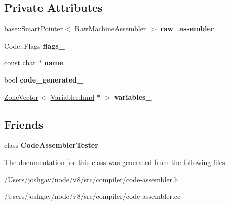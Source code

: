 \subsection*{Private Attributes}
\begin{DoxyCompactItemize}
\item 
\hyperlink{classv8_1_1base_1_1_smart_pointer}{base\+::\+Smart\+Pointer}$<$ \hyperlink{classv8_1_1internal_1_1compiler_1_1_raw_machine_assembler}{Raw\+Machine\+Assembler} $>$ {\bfseries raw\+\_\+assembler\+\_\+}\hypertarget{classv8_1_1internal_1_1compiler_1_1_code_assembler_a4623ee835dcea842de9611fb838ee271}{}\label{classv8_1_1internal_1_1compiler_1_1_code_assembler_a4623ee835dcea842de9611fb838ee271}

\item 
Code\+::\+Flags {\bfseries flags\+\_\+}\hypertarget{classv8_1_1internal_1_1compiler_1_1_code_assembler_a9f59933664fc0a8542f56fc3f664edcc}{}\label{classv8_1_1internal_1_1compiler_1_1_code_assembler_a9f59933664fc0a8542f56fc3f664edcc}

\item 
const char $\ast$ {\bfseries name\+\_\+}\hypertarget{classv8_1_1internal_1_1compiler_1_1_code_assembler_a4257e9c071331474a2b2b68cfefdcca6}{}\label{classv8_1_1internal_1_1compiler_1_1_code_assembler_a4257e9c071331474a2b2b68cfefdcca6}

\item 
bool {\bfseries code\+\_\+generated\+\_\+}\hypertarget{classv8_1_1internal_1_1compiler_1_1_code_assembler_a62b3230328488fe428e23073c48e54b1}{}\label{classv8_1_1internal_1_1compiler_1_1_code_assembler_a62b3230328488fe428e23073c48e54b1}

\item 
\hyperlink{classv8_1_1internal_1_1_zone_vector}{Zone\+Vector}$<$ \hyperlink{classv8_1_1internal_1_1compiler_1_1_code_assembler_1_1_variable_1_1_impl}{Variable\+::\+Impl} $\ast$ $>$ {\bfseries variables\+\_\+}\hypertarget{classv8_1_1internal_1_1compiler_1_1_code_assembler_ac4a0b3d68b7d096743b47905b5689485}{}\label{classv8_1_1internal_1_1compiler_1_1_code_assembler_ac4a0b3d68b7d096743b47905b5689485}

\end{DoxyCompactItemize}
\subsection*{Friends}
\begin{DoxyCompactItemize}
\item 
class {\bfseries Code\+Assembler\+Tester}\hypertarget{classv8_1_1internal_1_1compiler_1_1_code_assembler_a05cce2eb018d053015c8945e565d5ec1}{}\label{classv8_1_1internal_1_1compiler_1_1_code_assembler_a05cce2eb018d053015c8945e565d5ec1}

\end{DoxyCompactItemize}


The documentation for this class was generated from the following files\+:\begin{DoxyCompactItemize}
\item 
/\+Users/joshgav/node/v8/src/compiler/code-\/assembler.\+h\item 
/\+Users/joshgav/node/v8/src/compiler/code-\/assembler.\+cc\end{DoxyCompactItemize}
